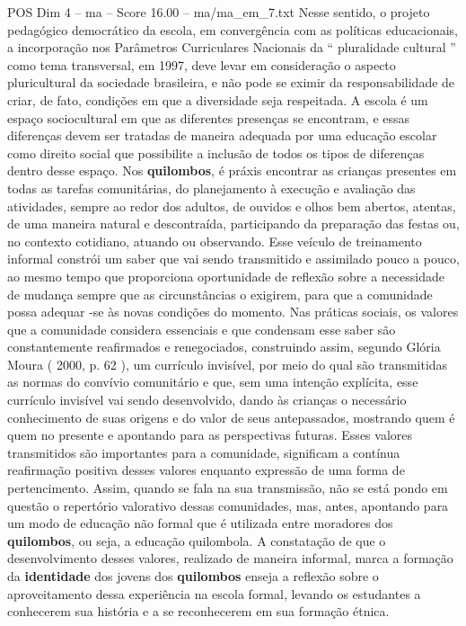 \begin{textsample}{POS Dim 4 – ma – Score 16.00 – ma/ma\_em\_7.txt}
Nesse sentido, o projeto pedagógico democrático da escola, em convergência com as políticas educacionais, a incorporação nos Parâmetros Curriculares Nacionais da “ pluralidade cultural ” como tema transversal, em 1997, deve levar em consideração o aspecto pluricultural da sociedade brasileira, e não pode se eximir da responsabilidade de criar, de fato, condições em que a diversidade seja respeitada.
A escola é um espaço sociocultural em que as diferentes presenças se encontram, e essas diferenças devem ser tratadas de maneira adequada por uma educação escolar como direito social que possibilite a inclusão de todos os tipos de diferenças dentro desse espaço.
Nos \textbf{quilombos}, é práxis encontrar as crianças presentes em todas as tarefas comunitárias, do planejamento à execução e avaliação das atividades, sempre ao redor dos adultos, de ouvidos e olhos bem abertos, atentas, de uma maneira natural e descontraída, participando da preparação das festas ou, no contexto cotidiano, atuando ou observando.
Esse veículo de treinamento informal constrói um saber que vai sendo transmitido e assimilado pouco a pouco, ao mesmo tempo que proporciona oportunidade de reflexão sobre a necessidade de mudança sempre que as circunstâncias o exigirem, para que a comunidade possa adequar -se às novas condições do momento.
Nas práticas sociais, os valores que a comunidade considera essenciais e que condensam esse saber são constantemente reafirmados e renegociados, construindo assim, segundo Glória Moura ( 2000, p. 62 ), um currículo invisível, por meio do qual são transmitidas as normas do convívio comunitário e que, sem uma intenção explícita, esse currículo invisível vai sendo desenvolvido, dando às crianças o necessário conhecimento de suas origens e do valor de seus antepassados, mostrando quem é quem no presente e apontando para as perspectivas futuras.
Esses valores transmitidos são importantes para a comunidade, significam a contínua reafirmação positiva desses valores enquanto expressão de uma forma de pertencimento.
Assim, quando se fala na sua transmissão, não se está pondo em questão o repertório valorativo dessas comunidades, mas, antes, apontando para um modo de educação não formal que é utilizada entre moradores dos \textbf{quilombos}, ou seja, a educação quilombola.
A constatação de que o desenvolvimento desses valores, realizado de maneira informal, marca a formação da \textbf{identidade} dos jovens dos \textbf{quilombos} enseja a reflexão sobre o aproveitamento dessa experiência na escola formal, levando os estudantes a conhecerem sua história e a se reconhecerem em sua formação étnica.

\end{textsample}
